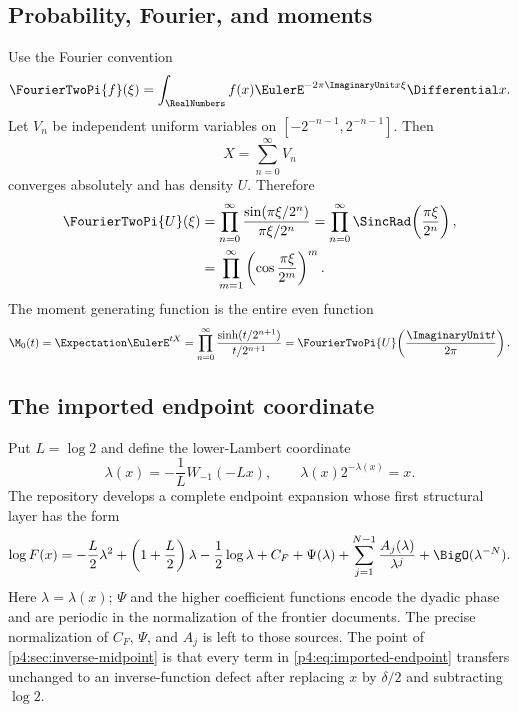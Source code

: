 \documentclass[11pt]{article}
\numberwithin{equation}{section}
\theoremstyle{definition}
\theoremstyle{remark}
\begin{document}
\subsection{Probability, Fourier, and moments}
Use the Fourier convention
\begin{equation}
 \FourierTwoPi{f}(\xi)=\int_{\RealNumbers}f(x)\EulerE^{-2\pi\ImaginaryUnit x\xi}\Differential x.
 \label{p4:eq:fourier-convention}
\end{equation}
Let $V_n$ be independent uniform variables on
$[-2^{-n-1},2^{-n-1}]$.  Then
\begin{equation}
 X=\sum_{n=0}^{\infty}V_n
 \label{p4:eq:random-series}
\end{equation}
converges absolutely and has density $U$.  Therefore
\begin{align}
 \FourierTwoPi{U}(\xi)
 &=\prod_{n=0}^{\infty}
   \frac{\sin(\pi\xi/2^n)}{\pi\xi/2^n}
  =\prod_{n=0}^{\infty}\SincRad\!\left(\frac{\pi\xi}{2^n}\right),
 \label{p4:eq:sinc-product}\\
 &=\prod_{m=1}^{\infty}
   \left(\cos\frac{\pi\xi}{2^m}\right)^m.
 \label{p4:eq:cos-product}
\end{align}
The moment generating function is the entire even function
\begin{equation}
 \M_0(t)=\Expectation\EulerE^{tX}
 =\prod_{n=0}^{\infty}
   \frac{\sinh(t/2^{n+1})}{t/2^{n+1}}
 =\FourierTwoPi{U}\!\left(\frac{\ImaginaryUnit t}{2\pi}\right).
 \label{p4:eq:mgf}
\end{equation}

\subsection{The imported endpoint coordinate}
Put $L=\log2$ and define the lower-Lambert coordinate~\cite{p4:corless,p4:frontier}
\begin{equation}
 \lambda(x)=-\frac1L W_{-1}(-Lx),
 \qquad \lambda(x)2^{-\lambda(x)}=x.
 \label{p4:eq:lambda}
\end{equation}
The repository develops a complete endpoint expansion whose first structural layer has the form
\begin{equation}
 \log F(x)
 =-\frac L2\lambda^2
  +\left(1+\frac L2\right)\lambda
  -\frac12\log\lambda
  +C_F+\Psi(\lambda)
  +\sum_{j=1}^{N-1}\frac{A_j(\lambda)}{\lambda^j}
  +\BigO(\lambda^{-N}).
 \label{p4:eq:imported-endpoint}
\end{equation}
Here $\lambda=\lambda(x)$; $\Psi$ and the higher coefficient functions encode the dyadic phase and are periodic in the normalization of the frontier documents.  The precise normalization of $C_F$, $\Psi$, and $A_j$ is left to those sources.  The point of \cref{p4:sec:inverse-midpoint} is that every term in \eqref{p4:eq:imported-endpoint} transfers unchanged to an inverse-function defect after replacing $x$ by $\delta/2$ and subtracting $\log2$.
\end{document}
